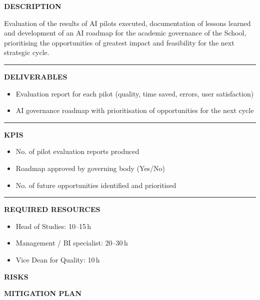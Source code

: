 \documentclass[11pt,a4paper]{scrreprt}
\newcommand{\fieldlabel}[1]{%
  {\footnotesize\sffamily\bfseries\color{mutedcolor}\MakeUppercase{#1}}\par\nopagebreak[4]
}
\newcommand{\fieldsep}{\vspace{3pt}\noindent\textcolor{bordercolor}{\rule{\linewidth}{0.4pt}}\vspace{3pt}\par}
\begin{document}
\begin{tcolorbox}[pabox={gobcolor}{A.P.4.2 \enspace\textbullet\enspace Evaluation of Results and AI Roadmap in Governance}]

\fieldlabel{Description}
{\small Evaluation of the results of AI pilots executed, documentation of lessons learned and development of an AI roadmap for the academic governance of the School, prioritising the opportunities of greatest impact and feasibility for the next strategic cycle.}\par
\fieldsep
\fieldlabel{Deliverables}
{\small \begin{itemize}[noitemsep,topsep=2pt]
\item Evaluation report for each pilot (quality, time saved, errors, user satisfaction)
\item AI governance roadmap with prioritisation of opportunities for the next cycle
\end{itemize}}\par
\fieldsep
\fieldlabel{KPIs}
{\small \begin{itemize}[noitemsep,topsep=2pt]
\item No. of pilot evaluation reports produced
\item Roadmap approved by governing body (Yes/No)
\item No. of future opportunities identified and prioritised
\end{itemize}}\par
\fieldsep
\fieldlabel{Required Resources}
{\small \begin{itemize}[noitemsep,topsep=2pt]
\item Head of Studies: 10--15\,h
\item Management / BI specialist: 20--30\,h
\item Vice Dean for Quality: 10\,h
\end{itemize}}\par
\end{tcolorbox}
\begin{tcolorbox}[riskbox]
{\footnotesize\sffamily\bfseries\color{red!50!black} RISKS}\par{}
\end{tcolorbox}
\begin{tcolorbox}[mitbox]
{\footnotesize\sffamily\bfseries\color{green!40!black} MITIGATION PLAN}\par{}
\end{tcolorbox}
\vspace{8pt}
\end{document}
